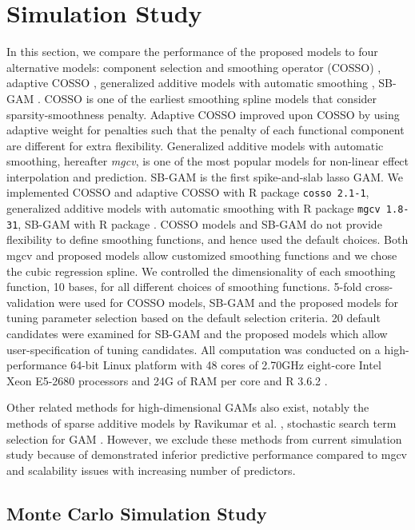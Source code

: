 \documentclass[AMA,STIX1COL,]{WileyNJD-v2}
\begin{document}
\hypertarget{simulation-study}{%
\section{Simulation Study}\label{simulation-study}}

In this section, we compare the performance of the proposed models to
four alternative models: component selection and smoothing operator
(COSSO) \citep{Zhang2006GAM}, adaptive COSSO \citep{Storlie2011},
generalized additive models with automatic smoothing \citep{Wood2011},
SB-GAM \citep{Bai2021}. COSSO is one of the earliest smoothing spline
models that consider sparsity-smoothness penalty. Adaptive COSSO
improved upon COSSO by using adaptive weight for penalties such that the
penalty of each functional component are different for extra
flexibility. Generalized additive models with automatic smoothing,
hereafter \textit{mgcv}, is one of the most popular models for
non-linear effect interpolation and prediction. SB-GAM is the first
spike-and-slab lasso GAM. We implemented COSSO and adaptive COSSO with R
package \texttt{cosso 2.1-1}, generalized additive models with automatic
smoothing with R package \texttt{mgcv 1.8-31}, SB-GAM with R package
. COSSO models and SB-GAM do not provide flexibility
to define smoothing functions, and hence used the default choices. Both
mgcv and proposed models allow customized smoothing functions and we
chose the cubic regression spline. We controlled the dimensionality of
each smoothing function, 10 bases, for all different choices of
smoothing functions. 5-fold cross-validation were used for COSSO models,
SB-GAM and the proposed models for tuning parameter selection based on
the default selection criteria. 20 default candidates were examined for
SB-GAM and the proposed models which allow user-specification of tuning
candidates. All computation was conducted on a high-performance 64-bit
Linux platform with 48 cores of 2.70GHz eight-core Intel Xeon E5-2680
processors and 24G of RAM per core and R 3.6.2 \citep{R}.

Other related methods for high-dimensional GAMs also exist, notably the
methods of sparse additive models by Ravikumar et al.
\citep{Ravikumar2009}, stochastic search term selection for GAM
\citep{Scheipl2012}. However, we exclude these methods from current
simulation study because of demonstrated inferior predictive performance
compared to mgcv and scalability issues with increasing number of
predictors. \citep{Scheipl2013}

\hypertarget{monte-carlo-simulation-study}{%
\subsection{Monte Carlo Simulation
Study}\label{monte-carlo-simulation-study}}
\end{document}

